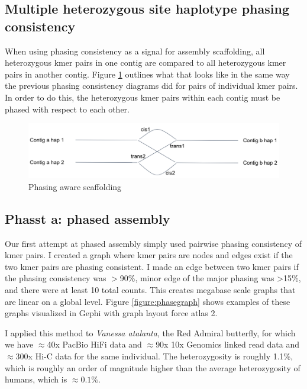 \subsection{Multiple heterozygous site haplotype phasing consistency}

\par{
When using phasing consistency as a signal for assembly scaffolding, all heterozygous kmer pairs in one contig are compared to all heterozygous kmer pairs in another contig. Figure \ref{figure:scaff} outlines what that looks like in the same way the previous phasing consistency diagrams did for pairs of individual kmer pairs. In order to do this, the heterozygous kmer pairs within each contig must be phased with respect to each other.
}

\begin{figure}[htbp!]
\caption{Phasing aware scaffolding}
\label{figure:scaff}
\begin{centering}
\includegraphics[width=\textwidth]{phasescaff.png}
\end{centering}
\end{figure}


\subsection{Phasst a: phased assembly}

\par{
Our first attempt at phased assembly simply used pairwise phasing consistency of kmer pairs. I created a graph where kmer pairs are nodes and edges exist if the two kmer pairs are phasing consistent. I made an edge between two kmer pairs if the phasing consistency was $>$90\%, minor edge of the major phasing was >15\%, and there were at least 10 total counts. This creates megabase scale graphs that are linear on a global level. Figure \ref{figure:phasegraph} shows examples of these graphs visualized in Gephi with graph layout force atlas 2\cite{gephi}\cite{forceatlas2}. 
}

\par{
I applied this method to \textit{Vanessa atalanta}, the Red Admiral butterfly, for which we have $\approx$40x PacBio HiFi data and $\approx$90x 10x Genomics linked read data and $\approx$300x Hi-C data for the same individual. The heterozygosity is roughly 1.1\%, which is roughly an order of magnitude higher than the average heterozygosity of humans, which is $\approx0.1\%$.
}

